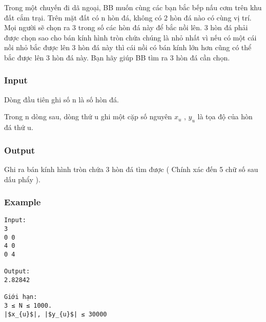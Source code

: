



   Trong một chuyến đi dã ngoại, BB muốn cùng các bạn bắc bếp nấu cơm trên khu đất cắm trại. Trên mặt đất có n hòn đá, không có 2 hòn đá nào có cùng vị trí. Mọi người sẽ chọn ra 3 trong số các hòn đá này để bắc nồi lên. 3 hòn đá phải được chọn sao cho bán kính hình tròn chứa chúng là nhỏ nhất vì nếu có một cái nồi nhỏ bắc được lên 3 hòn đá này thì cái nồi có bán kính lớn hơn cũng có thể bắc được lên 3 hòn đá này. Bạn hãy giúp BB tìm ra 3 hòn đá cần chọn.  

\subsubsection{   Input  }

   Dòng đầu tiên ghi số n là số hòn đá.  

   Trong n dòng sau, dòng thứ u ghi một cặp số nguyên $x_{u}$   , $y_{u}$   là tọa độ của hòn đá thứ u.  

\subsubsection{   Output  }

   Ghi ra bán kính hình tròn chứa 3 hòn đá tìm được ( Chính xác đến 5 chữ số sau dấu phẩy ).  

\subsubsection{   Example  }
\begin{verbatim}
Input:
3
0 0
4 0
0 4

Output:
2.82842

Giới hạn:
3 ≤ N ≤ 1000. 
|$x_{u}$|, |$y_{u}$| ≤ 30000

\end{verbatim}
